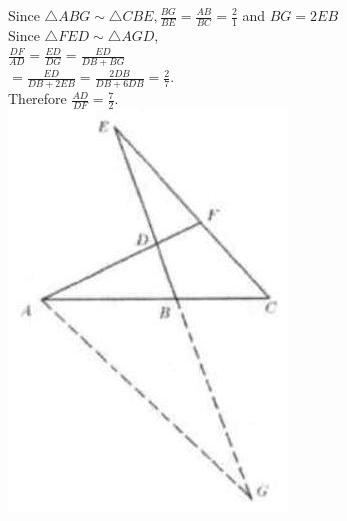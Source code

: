 \documentclass{article}
\begin{document}
Since \(\triangle A B G \sim \triangle C B E, \frac{B G}{B E}=\frac{A B}{B C}=\frac{2}{1}\) and \(B G=2 E B\)\\
Since \(\triangle F E D \sim \triangle A G D\),\\
\(\frac{D F}{A D}=\frac{E D}{D G}=\frac{E D}{D B+B G}\)\\
\(=\frac{E D}{D B+2 E B}=\frac{2 D B}{D B+6 D B}=\frac{2}{7}\).\\
Therefore \(\frac{A D}{D F}=\frac{7}{2}\).\\
\centering
\includegraphics[width=\textwidth]{images/113(2).jpg}
\end{document}
